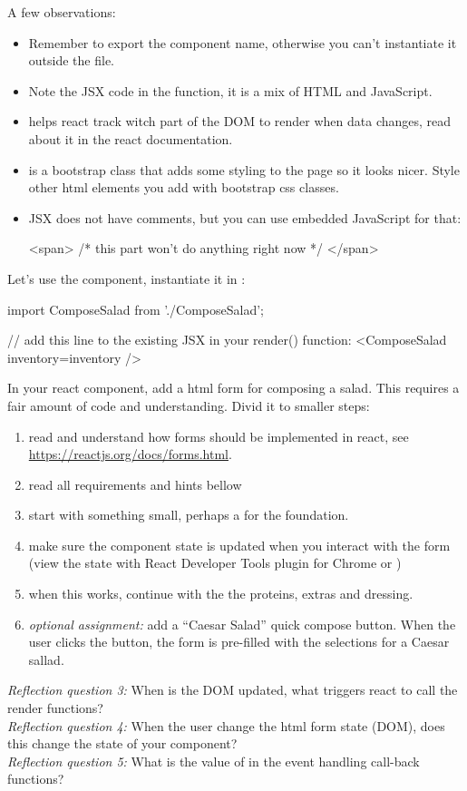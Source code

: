 \documentclass[fleqn, article, a4paper]{memoir}
\begin{document}
\begin{Assignments}
\noindent A few observations:
\begin{itemize}
  \item Remember to export the component name, otherwise you can't instantiate it outside the file.
  \item Note the JSX code in the  function, it is a mix of HTML and JavaScript.
   \item {} helps react track witch part of the DOM to render when data changes, read about it in the react documentation.
   \item {} is a bootstrap class that adds some styling to the page so it looks nicer. Style other html elements you add with bootstrap css classes.
   \item JSX does not have comments, but you can use embedded JavaScript for that:
\begin{Code}
<span>  {/* this part won't do anything right now */}  </span>
\end{Code}
\end{itemize}
\item Let's use the component, instantiate it in :
\begin{Code}
import ComposeSalad from './ComposeSalad';

// add this line to the existing JSX in your render() function:
<ComposeSalad inventory={inventory} />
\end{Code}

\item In your  react component, add a html form for composing a salad. This requires a fair amount of code and understanding. Divid it to smaller steps:
\begin{enumerate}
  \item read and understand how forms should be implemented in react, see \url{https://reactjs.org/docs/forms.html}.
  \item read all requirements and hints bellow
  \item start with something small, perhaps a  for the foundation.
  \item make sure the component state is updated when you interact with the form (view the state with React Developer Tools plugin for Chrome or )
  \item when this works, continue with the the proteins, extras and dressing.
  \item \emph{optional assignment:} add a ``Caesar Salad'' quick compose button. When the user clicks the button, the form is pre-filled with the selections for a Caesar sallad.
\end{enumerate}
\emph{Reflection question 3:} When is the DOM updated, what triggers react to call the render functions?
\\\emph{Reflection question 4:} When the user change the html form state (DOM), does this change the state of your component?
\\\emph{Reflection question 5:} What is the value of  in the event handling call-back functions?


\end{Assignments}
\end{document}
